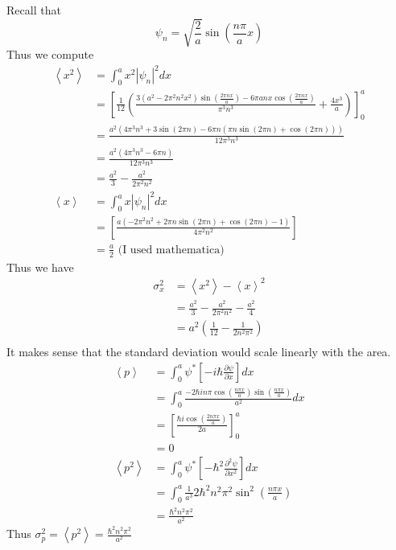 \documentclass{article}
\newcommand{\ddx}[1]{\frac{\partial #1}{\partial x}}
\newcommand{\dddx}[1]{\frac{\partial^2 #1}{\partial x^2}}
\newcommand{\bracket}[1]{\left[ #1 \right]}
\newcommand{\paren}[1]{\left( #1 \right)}
\newcommand{\braket}[1]{\left\langle #1 \right\rangle}
\begin{document}
Recall that
$$\psi_n = \sqrt{\frac2a}\sin(\frac{n\pi}{a}x)$$
Thus we compute 
\begin{align*}
  \braket{x^2} &= \int_0^a x^2 |\psi_n|^2 dx \\
             &= \bracket{\frac{1}{12} \left(\frac{3 \left(a^2-2 \pi ^2 n^2 x^2\right) \sin \left(\frac{2 \pi  n x}{a}\right)-6 \pi  a n x \cos \left(\frac{2 \pi  n x}{a}\right)}{\pi ^3 n^3}+\frac{4 x^3}{a}\right)}_0^a \\
             &= \frac{a^2 \left(4 \pi ^3 n^3+3 \sin (2 \pi  n)-6 \pi  n (\pi  n \sin (2 \pi  n)+\cos (2 \pi  n))\right)}{12 \pi ^3 n^3} \\
             &= \frac{a^2(4\pi^3n^3 - 6 \pi n )}{12\pi^3n^3}  \\
             &= \frac{a^2}{3} - \frac{a^2}{2\pi^2n^2}\\ 
  \braket{x} &= \int_0^a x |\psi_n|^2 dx \\
             &= \bracket{\frac{a \left(-2 \pi ^2 n^2+2 \pi  n \sin (2 \pi  n)+\cos (2 \pi  n)-1\right)}{4 \pi ^2 n^2}} \\
             &= \frac{a}{2} \text{ (I used mathematica) }
\end{align*}
Thus we have 
\begin{align*}
  \sigma_x^2 &= \braket{x^2} - \braket{x}^2 \\
             &= \frac{a^2}{3} - \frac{a^2}{2\pi^2n^2} - \frac{a^2}4 \\
             &= a^2 \paren{\frac{1}{12} - \frac{1}{2n^2\pi^2}} \\
\end{align*}
It makes sense that the standard deviation would scale linearly with the area.
\begin{align*}
  \braket{p} &= \int_0^a \psi^* \bracket{-i\hbar \ddx{\psi}} dx \\
             &= \int_0^a \frac{-2\hbar i n \pi \cos(\frac{n \pi x}{a}) \sin(\frac{n\pi x}{a})}{a^2} dx \\
             &= \bracket{\frac{\hbar i \cos(\frac{2 n \pi x}{a})}{2a}}_0^a \\
             &= 0  \\
  \braket{p^2} &= \int_0^a \psi^* \bracket{-\hbar^2 \dddx{\psi}} dx \\
               &= \int_0^a \frac{1}{a^3} 2\hbar^2 n^2 \pi^2 \sin^2(\frac{n\pi x}{a}) \\
               &= \frac{\hbar^2 n^2 \pi^2}{a^2}
\end{align*}
Thus $\sigma_p^2 = \braket{p^2} = \frac{\hbar^2 n^2 \pi^2}{a^2}$
\end{document}
